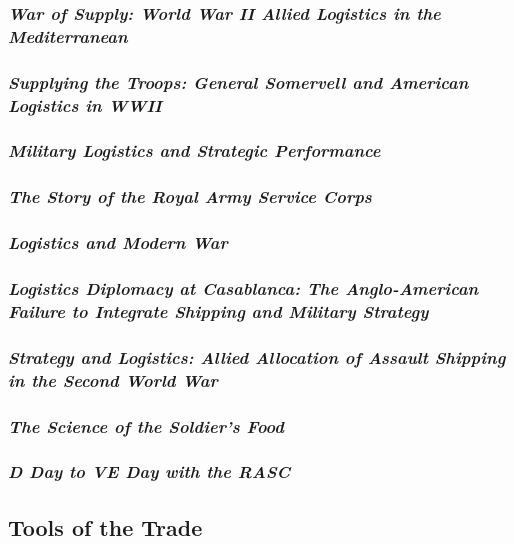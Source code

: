 \documentclass[noraggedright]{turabian-researchpaper}
\begin{document}

		\subsubsection{\textit{War of Supply:  World War II Allied
			Logistics in the Mediterranean}}
		\subsubsection{\textit{Supplying the Troops:  General 
			Somervell and American Logistics in WWII}}
		\subsubsection{\textit{Military Logistics and Strategic 
			Performance}}
		\subsubsection{\textit{The Story of the Royal Army Service
			Corps}}
		\subsubsection{\textit{Logistics and Modern War}}
		\subsubsection{\textit{Logistics Diplomacy at Casablanca: 
			The Anglo-American Failure to Integrate Shipping and
			Military Strategy}}
		\subsubsection{\textit{Strategy and Logistics:  Allied
			Allocation of Assault Shipping in the Second World
			War}}
		\subsubsection{\textit{The Science of the Soldier's Food}}
		\subsubsection{\textit{D Day to VE Day with the RASC}}
	
		

		

	\subsection{Tools of the Trade} %
\end{document}
